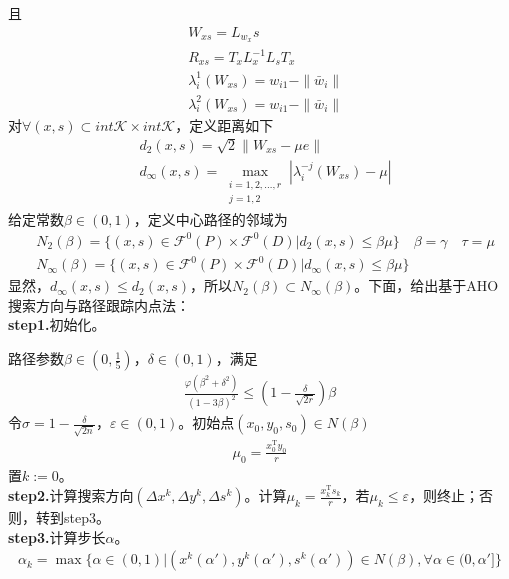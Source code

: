         且
        \begin{align*}
           & W_{xs} = L_{w_x}s\\
           & R_{xs} = T_{x}L_{x}^{-1}L_sT_x\\
           & {\lambda}_i^1(W_{xs})=w_{i1}-\|{\bar{w}}_i\|\\
           & {\lambda}_i^2(W_{xs})=w_{i1}-\|{\bar{w}}_i\|
        \end{align*}
        对$\forall (x,s)\subset int{}\mathcal{K}\times int{}\mathcal{K}$，定义距离如下
        \begin{align*}
           & d_{2}(x,s) = \sqrt{2}\|W_{xs}-\mu e\|\\
           & d_{\infty}(x,s) = \mathop{\max}\limits_{\substack{i=1,2,\ldots,r\\j=1,2}}|{\lambda}_i^{-j}(W_{xs})-\mu |
        \end{align*}
        给定常数$\beta \in (0,1)$，定义中心路径的邻域为
        \begin{align*}
           & N_{2}(\beta) = \{(x,s)\in \mathscr{F}^0(P)\times \mathscr{F}^0(D)|d_2(x,s)\leqslant \beta \mu\}\quad \beta = \gamma\quad \tau=\mu\\
           & N_{\infty}(\beta) = \{(x,s)\in \mathscr{F}^0(P)\times \mathscr{F}^0(D)|d_{\infty}(x,s)\leqslant \beta \mu\}
        \end{align*}
        显然，$d_{\infty}(x,s)\leqslant d_2(x,s)$，所以$N_{2}(\beta)\subset N_{\infty}(\beta)$。下面，给出基于AHO搜索方向与路径跟踪内点法：\\
        \textbf{step1.}初始化。\par
        路径参数$\beta \in (0,\frac 15)$，$\delta \in (0,1)$，满足
        \begin{align*}
        \frac{\varphi({\beta}^2+{\delta}^2)}{(1-3\beta)^2}\leqslant \left( 1-\frac{\delta}{\sqrt{2r}} \right) \beta
        \end{align*}
        令$\sigma = 1-\frac{\delta}{\sqrt{2n}}$，$\varepsilon \in (0,1)$。初始点$(x_0,y_0,s_0)\in N(\beta)$
        \begin{align*}
        {\mu}_0=\frac{x_0^\mathrm{T} y_0}{r}
        \end{align*}
        置$k:=0$。\\
        \textbf{step2.}计算搜索方向$(\Delta x^k,\Delta y^k,\Delta s^k)$。计算${\mu}_k=\frac{x_k^\mathrm{T} s_k}{r}$，若${\mu}_k\leqslant \varepsilon$，则终止；否则，转到step3。\\
        \textbf{step3.}计算步长$\alpha$。
        \begin{align*}
        {\alpha}_k={\max}\{\alpha \in (0,1)|(x^k({\alpha}'),y^k({\alpha}'),s^k({\alpha}'))\in N(\beta),\forall \alpha \in (0,{\alpha}']\}
        \end{align*}
